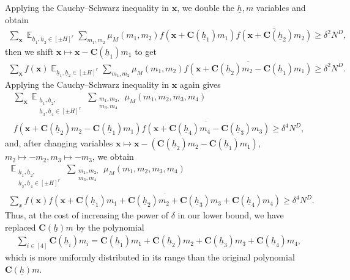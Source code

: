 \documentclass[11pt]{amsart}
\theoremstyle{definition}
\DeclareMathOperator*{\E}{\mathbb{E}}
\newcommand{\bc}{{\mathbf{C}}}
\newcommand{\bx}{{\mathbf{x}}}
\newcommand{\uh}{{\underline{h}}}
\newcommand{\brac}[1]{\mathopen{}\left( #1 \mathclose{}\right)}
\begin{document}
Applying the Cauchy--Schwarz inequality in $\bx$, we double the $\uh, m$ variables and obtain
\begin{align*}
    \sum_\bx \E_{\uh_1, \uh_2\in[\pm H]^r}\sum_{m_1, m_2}\mu_M(m_1, m_2) f(\bx + \bc(\uh_1) m_1)\overline{f(\bx + \bc(\uh_2) m_2)}\geq \delta^2 N^D,
\end{align*}
then we shift $\bx\mapsto \bx-\bc(\uh_1)m_1$ to get
\begin{align*}
    \sum_\bx f(\bx) \E_{\uh_1, \uh_2\in[\pm H]^r}\sum_{m_1, m_2}\mu_M(m_1, m_2)\overline{f(\bx + \bc(\uh_2) m_2-\bc(\uh_1) m_1)}\geq \delta^2 N^D.
\end{align*}
Applying the Cauchy--Schwarz inequality in $\bx$ again gives
\begin{multline*}
    \sum_\bx \E_{\substack{\uh_{1}, \uh_{2},\\ \uh_{3}, \uh_{4}\in[\pm H]^r}}\sum_{\substack{m_{1}, m_{2},\\ m_{3}, m_{4}}}\mu_M(m_{1}, m_{2}, m_{3}, m_{4})\\
    f(\bx + \bc(\uh_{2}) m_{2}-\bc(\uh_{1}) m_{1})\overline{f(\bx + \bc(\uh_{4}) m_{4}-\bc(\uh_{3}) m_{3})} \geq \delta^4 N^D,
\end{multline*}
and, after changing variables $\bx\mapsto \bx - (\bc(\uh_{2}) m_{2}-\bc(\uh_{1}) m_{1})$, $m_2\mapsto -m_2, m_3\mapsto -m_3$, we obtain
\begin{multline*}
    \E_{\substack{\uh_{1}, \uh_{2},\\ \uh_{3}, \uh_{4}\in[\pm H]^r}}\sum_{\substack{m_{1}, m_{2},\\ m_{3}, m_{4}}}\mu_M(m_{1}, m_{2}, m_{3}, m_{4})\\
    \sum_x f(\bx)\overline{f\brac{\bx+\bc(\uh_{1}) m_{1}+\bc(\uh_{2}) m_{2} + \bc(\uh_{3}) m_{3}+\bc(\uh_{4}) m_{4}}}\geq \delta^{4} N^D.
\end{multline*}
Thus, at the cost of increasing the power of $\delta$ in our lower bound, we have replaced $\bc(\uh) m$ by the polynomial 
\begin{align*}\label{eq:first-CS-outcome}
    \sum\limits_{i\in[4]}\bc(\uh_i)m_{i} = \bc(\uh_{1}) m_{1}+\bc(\uh_{2}) m_{2} + \bc(\uh_{3}) m_{3}+\bc(\uh_{4}) m_{4},
\end{align*}
 which is more uniformly distributed in its range than the original polynomial $\bc(\uh) m$. 
\end{document}
